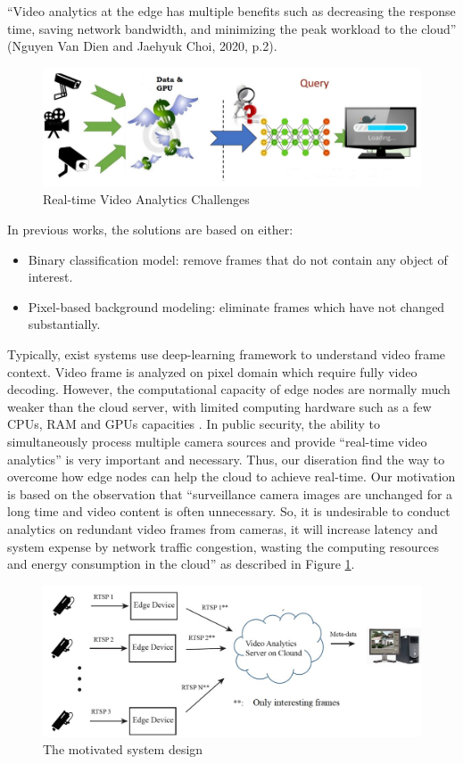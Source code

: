 “Video analytics at the edge has multiple benefits such as decreasing the response time, saving network bandwidth, and minimizing the peak workload to the cloud” (Nguyen Van Dien and Jaehyuk Choi, 2020, p.2). 
\begin{figure}
\centering
 \includegraphics[width=1.0\linewidth]{Figures/vachallenge.png}
 \caption{Real-time Video Analytics Challenges}
 \label{fig:chal}
\end{figure}
In previous works, the solutions are based on either:
\begin{itemize}
\item Binary classification model\cite{canel2019scaling}\cite{kang2017noscope}: remove frames that do not contain any object of interest.
\item Pixel-based background modeling\cite{chen2015glimpse}: eliminate frames which have not changed substantially.
\end{itemize}
Typically, exist systems use deep-learning framework to understand video frame context. Video frame is analyzed on pixel domain which require fully video decoding. However, the computational capacity of edge nodes are normally much weaker than the cloud server, with limited computing hardware such as a few CPUs, RAM and GPUs capacities \cite{stone2019towards}. In public security, the ability to simultaneously process multiple camera sources and provide “real-time video analytics” is very important and necessary. Thus, our diseration find the way to overcome how edge nodes can help the cloud to achieve real-time. Our motivation is based on the observation that “surveillance camera images are unchanged for a long time and video content is often unnecessary. So, it is undesirable to conduct analytics on redundant video frames from cameras, it will increase latency and system expense by network traffic congestion, wasting the computing resources and energy consumption in the cloud” as described in Figure \ref{fig:chal}. \\
\begin{figure}
\centering
 \includegraphics[width=1.0\linewidth]{Figures/motivation.jpg}
 \caption{The motivated system design}
 \label{fig:mot}
\end{figure}
